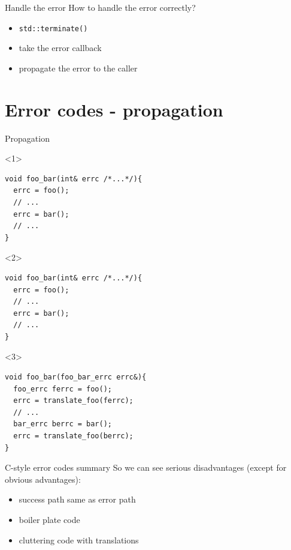\documentclass[10pt]{beamer}
\begin{document}
\begin{frame}{Handle the error}
	How to handle the error correctly?
	
	\pause
	
	\begin{itemize}[<+- | alert@+>]
		\item \texttt{std::terminate()}
		\item take the error callback
		\item propagate the error to the caller
	\end{itemize}
	
\end{frame}

\section{Error codes - propagation}

\begin{frame}[fragile]{Propagation}

\begin{onlyenv}<1>
\begin{verbatim}
void foo_bar(int& errc /*...*/){
  errc = foo();
  // ...
  errc = bar();		
  // ...
}
	\end{verbatim}
\end{onlyenv}

\begin{onlyenv}<2>
\begin{verbatim}
void foo_bar(int& errc /*...*/){
  errc = foo();
  // ...
  errc = bar();		
  // ...
}
\end{verbatim}
\end{onlyenv}

\begin{onlyenv}<3>
\begin{verbatim}
void foo_bar(foo_bar_errc errc&){
  foo_errc ferrc = foo();
  errc = translate_foo(ferrc);
  // ...
  bar_errc berrc = bar();
  errc = translate_foo(berrc);
}
	\end{verbatim}
\end{onlyenv}
\end{frame}


\begin{frame}{C-style error codes summary}
	So we can see {\color{red}serious disadvantages} (except for {\color{blue}obvious advantages}):
	
	\begin{itemize}[<+- | alert@+>]
		\item success path same as error path
		\item boiler plate code
		\item cluttering code with translations
	\end{itemize}
\end{frame}
	
\end{document}
